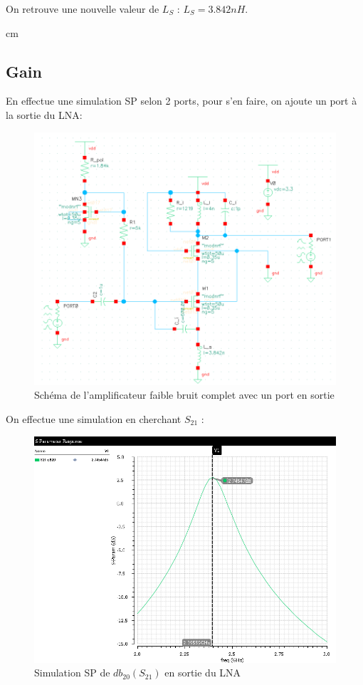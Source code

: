 \documentclass[a4paper]{article}
\begin{document}
On retrouve une nouvelle valeur de $L_S$ : $L_S = 3.842 nH$.

 cm

\subsection{Gain}
En effectue une simulation SP selon 2 ports, pour s'en faire, on ajoute un port \`a la sortie du LNA:

\begin{figure}[!htb]
\begin{center}
  \includegraphics[scale=0.30]{schematic_lna_global.png}
  \caption{Sch\'ema de l'amplificateur faible bruit complet avec un port en sortie}
  \label{schema-pol}
\end{center}
\end{figure}

\clearpage

On effectue une simulation en cherchant $S_{21}$ :

\begin{figure}[!htb]
\begin{center}
  \includegraphics[scale=0.45]{Q4-S21.png}
  \caption{Simulation SP de $db_{20} (S_{21})$ en sortie du LNA}
  \label{schema-pol}
\end{center}
\end{figure}
\end{document}
